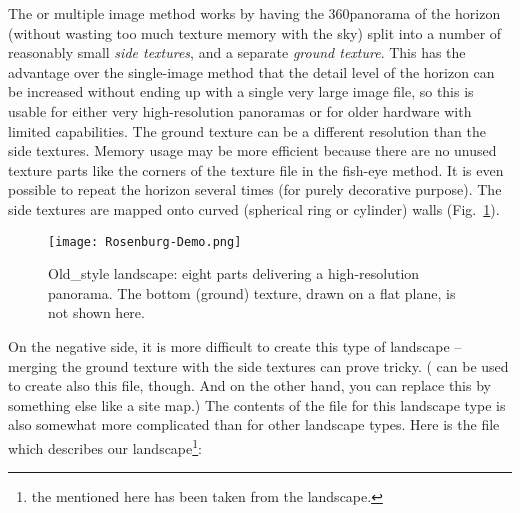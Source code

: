 The  or multiple image method works by having the
360\degree panorama of the horizon (without wasting too much texture
memory with the sky) split into a number of reasonably small
\emph{side textures}, and a separate \emph{ground texture}. This has
the advantage over the single-image method that the detail level of
the horizon can be increased without ending up with a single very
large image file, so this is usable for either very high-resolution
panoramas or for older hardware with limited capabilities. The ground
texture can be a different resolution than the side textures. Memory
usage may be more efficient because there are no unused texture parts
like the corners of the texture file in the fish-eye method. It is
even possible to repeat the horizon several times (for purely
decorative purpose). The side textures are mapped onto curved
(spherical ring or cylinder) walls
(Fig.~\ref{fig:landscapes:oldStyle}).

\begin{figure}[tb]
  \centering
   \texttt{[image: Rosenburg-Demo.png]}
   \caption{Old\_style landscape: eight parts delivering a
     high-resolution panorama. The bottom (ground) texture, drawn on a flat
     plane, is not shown here.}
  \label{fig:landscapes:oldStyle}
\end{figure}

On the negative side, it is more difficult to create this type of
landscape -- merging the ground texture with the side textures can
prove tricky. ( can be used to create also this file,
though. And on the other hand, you can replace this by something else
like a site map.) The contents of the  file for
this landscape type is also somewhat more complicated than for other
landscape types. Here is the  file which describes
our  landscape\footnote{the 
   mentioned here has been taken from the
   landscape.}:

